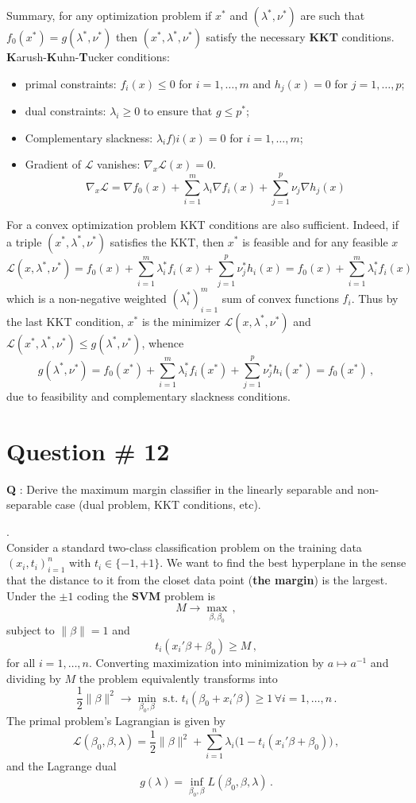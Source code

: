 \documentclass[a4paper]{article}
\newcommand{\Lcal}{\mathcal{L}}
\begin{document}
Summary, for any optimization problem if $x^*$ and $(\lambda^*,\nu^*)$ are such that
$f_0(x^*) = g(\lambda^*,\nu^*)$ then $(x^*,\lambda^*,\nu^*)$ satisfy the necessary
\textbf{KKT} conditions.
\textbf{K}arush-\textbf{K}uhn-\textbf{T}ucker conditions:
\begin{itemize}
	\item primal constraints: $f_i(x)\leq 0$ for $i=1,\ldots,m$ and $h_j(x) = 0$ for $j=1,\ldots,p$;
	\item dual constraints: $\lambda_i \geq 0$ to ensure that $g\leq p^*$;
	\item Complementary slackness: $\lambda_i f)i(x) = 0$ for $i=1,\ldots,m$;
	\item Gradient of $\Lcal$ vanishes: $\nabla_x \Lcal(x) = 0$.
	\[\nabla_x \Lcal = \nabla f_0(x) + \sum_{i=1}^m \lambda_i \nabla f_i(x) + \sum_{j=1}^p \nu_j \nabla h_j(x)\]
\end{itemize}

For a convex optimization problem KKT conditions are also sufficient. Indeed, if
a triple $(x^*,\lambda^*,\nu^*)$ satisfies the KKT, then $x^*$ is feasible and
for any feasible $x$
\[
\Lcal(x,\lambda^*,\nu^*)
= f_0(x) + \sum_{i=1}^m\lambda_i^* f_i(x) + \sum_{j=1}^p\nu_j^* h_i(x)
= f_0(x) + \sum_{i=1}^m\lambda_i^* f_i(x)
\]
which is a non-negative weighted $(\lambda_i^*)_{i=1}^m$ sum of convex functions
$f_i$. Thus by the last KKT condition, $x^*$ is the minimizer $\Lcal(x,\lambda^*,\nu^*)$
and $\Lcal(x^*,\lambda^*,\nu^*) \leq g(\lambda^*, \nu^*)$, whence
\[
g(\lambda^*,\nu^*)
= f_0(x^*) + \sum_{i=1}^m \lambda_i^* f_i(x^*) + \sum_{j=1}^p\nu_j^* h_i(x^*)
= f_0(x^*)\,,
\]
due to feasibility and complementary slackness conditions.

\clearpage

\section[SVM]{Question \# 12} %
\label{sec:question_12}
\textbf{\large \textbf{Q}} : Derive the maximum margin classifier in the linearly
separable and non-separable case (dual problem, KKT conditions, etc).

 .\hfill\\
Consider a standard two-class classification problem on the training data
$(x_i,t_i)_{i=1}^n$ with $t_i\in\{-1,+1\}$. We want to find the best hyperplane
in the sense that the distance to it from the closet data point (\textbf{the margin})
is the largest. Under the $\pm1$ coding the \textbf{SVM} problem is
\[ M \to \max_{\beta, \beta_0}\,, \]
subject to $\|\beta\| = 1$ and
\[t_i(x_i'\beta + \beta_0) \geq M\,,\]
for all $i=1,\ldots,n$. Converting maximization into minimization by $a\mapsto a^{-1}$
and dividing by $M$ the problem equivalently transforms into
\[
\frac{1}{2}\|\beta\|^2 \to \min_{\beta_0,\beta}
\text{ s.t. }
t_i(\beta_0+x_i'\beta)\geq 1\,\forall i=1,\ldots,n\,.
\]
The primal problem's Lagrangian is given by
\[
\Lcal(\beta_0, \beta, \lambda)
= \frac{1}{2} \|\beta\|^2 + \sum_{i=1}^n \lambda_i \bigl( 1 - t_i(x_i'\beta+\beta_0) \bigr)\,,
\]
and the Lagrange dual
\[
g(\lambda) = \inf_{\beta_0,\beta} L(\beta_0, \beta, \lambda)\,.
\]
\end{document}
